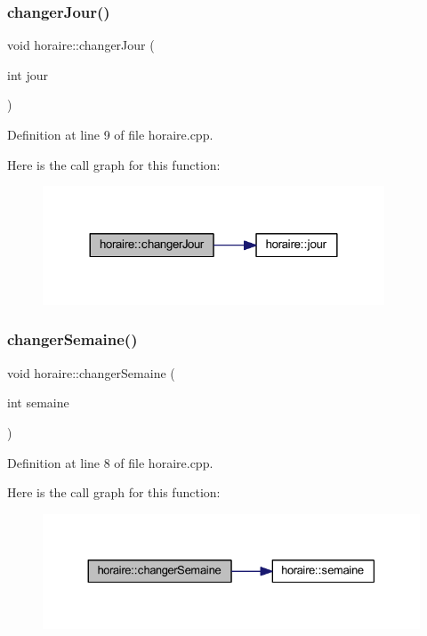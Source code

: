 \subsubsection{\texorpdfstring{changer\+Jour()}{changerJour()}}
{\footnotesize\ttfamily void horaire\+::changer\+Jour (\begin{DoxyParamCaption}\item[{int}]{jour }\end{DoxyParamCaption})}



Definition at line 9 of file horaire.\+cpp.

Here is the call graph for this function\+:\nopagebreak
\begin{figure}[H]
\begin{center}
\leavevmode
\includegraphics[width=288pt]{classhoraire_a5f9db9929031e9f94460a81dccf6e273_cgraph}
\end{center}
\end{figure}
\hypertarget{classhoraire_a8529f03119bbfd87a59a9efad6993f9d}{}\label{classhoraire_a8529f03119bbfd87a59a9efad6993f9d} 
\subsubsection{\texorpdfstring{changer\+Semaine()}{changerSemaine()}}
{\footnotesize\ttfamily void horaire\+::changer\+Semaine (\begin{DoxyParamCaption}\item[{int}]{semaine }\end{DoxyParamCaption})}



Definition at line 8 of file horaire.\+cpp.

Here is the call graph for this function\+:\nopagebreak
\begin{figure}[H]
\begin{center}
\leavevmode
\includegraphics[width=330pt]{classhoraire_a8529f03119bbfd87a59a9efad6993f9d_cgraph}
\end{center}
\end{figure}
\hypertarget{classhoraire_a3ddd3f0b63ef3c95802634d9ba072e0a}{}\label{classhoraire_a3ddd3f0b63ef3c95802634d9ba072e0a} 
